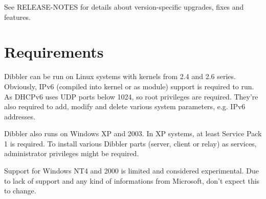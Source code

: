 See RELEASE-NOTES for details about version-specific upgrades, fixes
and features.

\section{Requirements}
Dibbler can be run on Linux systems with kernels from 2.4 and 2.6
series. Obviously, IPv6 (compiled into kernel or as module) support is
required to run. As DHCPv6 uses UDP ports below 1024, so root privileges
are required. They're also required to add, modify and delete various
system parameters, e.g. IPv6 addresses.

Dibbler also runs on Windows XP and 2003. In XP systems, at least
Service Pack 1 is required. To install various Dibbler parts (server,
client or relay) as services, administrator privileges might be
required. 

Support for Windows NT4 and 2000 is limited and considered
experimental. Due to lack of support and any kind of informations from
Microsoft, don't expect this to change.